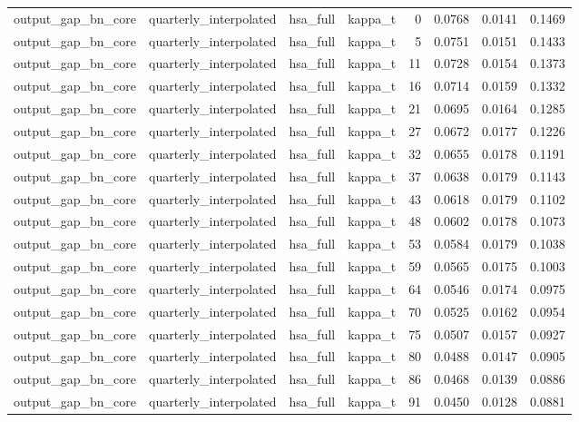 \begin{tabular}{llllrrrr}
output\_gap\_bn\_core & quarterly\_interpolated & hsa\_full & kappa\_t & 0 & 0.0768 & 0.0141 & 0.1469 \\
output\_gap\_bn\_core & quarterly\_interpolated & hsa\_full & kappa\_t & 5 & 0.0751 & 0.0151 & 0.1433 \\
output\_gap\_bn\_core & quarterly\_interpolated & hsa\_full & kappa\_t & 11 & 0.0728 & 0.0154 & 0.1373 \\
output\_gap\_bn\_core & quarterly\_interpolated & hsa\_full & kappa\_t & 16 & 0.0714 & 0.0159 & 0.1332 \\
output\_gap\_bn\_core & quarterly\_interpolated & hsa\_full & kappa\_t & 21 & 0.0695 & 0.0164 & 0.1285 \\
output\_gap\_bn\_core & quarterly\_interpolated & hsa\_full & kappa\_t & 27 & 0.0672 & 0.0177 & 0.1226 \\
output\_gap\_bn\_core & quarterly\_interpolated & hsa\_full & kappa\_t & 32 & 0.0655 & 0.0178 & 0.1191 \\
output\_gap\_bn\_core & quarterly\_interpolated & hsa\_full & kappa\_t & 37 & 0.0638 & 0.0179 & 0.1143 \\
output\_gap\_bn\_core & quarterly\_interpolated & hsa\_full & kappa\_t & 43 & 0.0618 & 0.0179 & 0.1102 \\
output\_gap\_bn\_core & quarterly\_interpolated & hsa\_full & kappa\_t & 48 & 0.0602 & 0.0178 & 0.1073 \\
output\_gap\_bn\_core & quarterly\_interpolated & hsa\_full & kappa\_t & 53 & 0.0584 & 0.0179 & 0.1038 \\
output\_gap\_bn\_core & quarterly\_interpolated & hsa\_full & kappa\_t & 59 & 0.0565 & 0.0175 & 0.1003 \\
output\_gap\_bn\_core & quarterly\_interpolated & hsa\_full & kappa\_t & 64 & 0.0546 & 0.0174 & 0.0975 \\
output\_gap\_bn\_core & quarterly\_interpolated & hsa\_full & kappa\_t & 70 & 0.0525 & 0.0162 & 0.0954 \\
output\_gap\_bn\_core & quarterly\_interpolated & hsa\_full & kappa\_t & 75 & 0.0507 & 0.0157 & 0.0927 \\
output\_gap\_bn\_core & quarterly\_interpolated & hsa\_full & kappa\_t & 80 & 0.0488 & 0.0147 & 0.0905 \\
output\_gap\_bn\_core & quarterly\_interpolated & hsa\_full & kappa\_t & 86 & 0.0468 & 0.0139 & 0.0886 \\
output\_gap\_bn\_core & quarterly\_interpolated & hsa\_full & kappa\_t & 91 & 0.0450 & 0.0128 & 0.0881 \\

\end{tabular}
